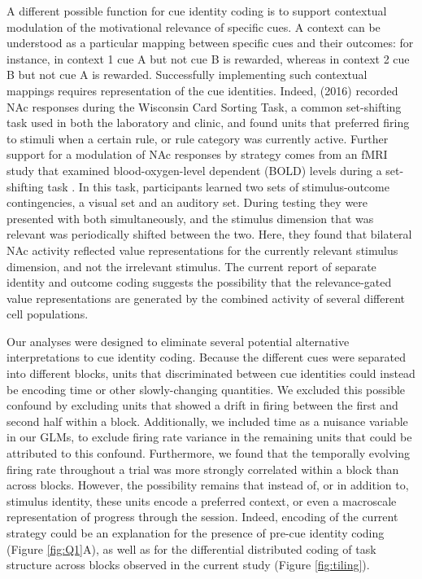 \documentclass[11pt]{article}
\let\cite=\citep
\begin{document}
A different possible function for cue identity coding is to support contextual modulation of the motivational relevance of specific cues. A context can be understood as a particular mapping between specific cues and their outcomes: for instance, in context 1 cue A but not cue B is rewarded, whereas in context 2 cue B but not cue A is rewarded. Successfully implementing such contextual mappings requires representation of the cue identities. Indeed, \citeauthor{Sleezer2016} (2016) recorded NAc responses during the Wisconsin Card Sorting Task, a common set-shifting task used in both the laboratory and clinic, and found units that preferred firing to stimuli when a certain rule, or rule category was currently active. Further support for a modulation of NAc responses by strategy comes from an fMRI study that examined blood-oxygen-level dependent (BOLD) levels during a set-shifting task \cite{Fitzgerald2014}. In this task, participants learned two sets of stimulus-outcome contingencies, a visual set and an auditory set. During testing they were presented with both simultaneously, and the stimulus dimension that was relevant was periodically shifted between the two. Here, they found that bilateral NAc activity reflected value representations for the currently relevant stimulus dimension, and not the irrelevant stimulus. The current report of separate identity and outcome coding suggests the possibility that the relevance-gated value representations are generated by the combined activity of several different cell populations.

Our analyses were designed to eliminate several potential alternative interpretations to cue identity coding. Because the different cues were separated into different blocks, units that discriminated between cue identities could instead be encoding time or other slowly-changing quantities. We excluded this possible confound by excluding units that showed a drift in firing between the first and second half within a block. Additionally, we included time as a nuisance variable in our GLMs, to exclude firing rate variance in the remaining units that could be attributed to this confound. Furthermore, we found that the temporally evolving firing rate throughout a trial was more strongly correlated within a block than across blocks. However, the possibility remains that instead of, or in addition to, stimulus identity, these units encode a preferred context, or even a macroscale representation of progress through the session. Indeed, encoding of the current strategy could be an explanation for the presence of pre-cue identity coding (Figure \ref{fig:Q1}A), as well as for the differential distributed coding of task structure across blocks observed in the current study (Figure \ref{fig:tiling}).
\end{document}
